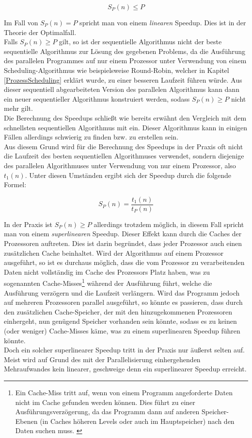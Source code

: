 				\[ S_P(n) \leq P \]
				
				Im Fall von \(S_P(n) = P\) spricht man von einem \textit{linearen} Speedup. Dies ist in der Theorie der Optimalfall.\\
				
				Falls \(S_P(n) \geq P\) gilt, so ist der sequentielle Algorithmus nicht der beste sequentielle Algorithmus zur Lösung des gegebenen Problems, da die Ausführung des parallelen Programmes auf nur einem Prozessor unter Verwendung von einem Scheduling-Algorithmus wie beispielsweise Round-Robin, welcher in Kapitel \ref{ProzessScheduling} erklärt wurde, zu einer besseren Laufzeit führen würde. Aus dieser sequentiell abgearbeiteten Version des parallelen Algorithmus kann dann ein neuer sequentieller Algorithmus konstruiert werden, sodass \(S_P(n) \geq P\) nicht mehr gilt.\\
				Die Berechnung des Speedups schließt wie bereits erwähnt den Vergleich mit dem schnellsten sequentiellen Algorithmus mit ein. Dieser Algorithmus kann in einigen Fällen allerdings schwierig zu finden bzw. zu erstellen sein.\\
				Aus diesem Grund wird für die Berechnung des Speedups in der Praxis oft nicht die Laufzeit des besten sequentiellen Algorithmuses verwendet, sondern diejenige des parallelen Algorithmuses unter Verwendung von nur einem Prozessor, also $t_1(n)$.
				Unter diesen Umständen ergibt sich der Speedup durch die folgende Formel:
				
				\[ S_P(n) = \frac{t_1(n)}{t_P(n)} \]
				
				In der Praxis ist \(S_P(n) \geq P\) allerdings trotzdem möglich, in diesem Fall spricht man von einem \textit{superlinearen} Speedup. Dieser Effekt kann durch die Caches der Prozessoren auftreten. Dies ist darin begründet, dass jeder Prozessor auch einen zusätzlichen Cache beinhaltet. Wird der Algorithmus auf einem Prozessor ausgeführt, so ist es durchaus möglich, dass die vom Prozessor zu verarbeitenden Daten nicht vollständig im Cache des Prozessors Platz haben, was zu sogenannten Cache-Misses\footnote{Ein Cache-Miss tritt auf, wenn von einem Programm angeforderte Daten nicht im Cache gefunden werden können. Dies führt zu einer Ausführungsverzögerung, da das Programm dann auf anderen Speicher-Ebenen (in Caches höheren Levels oder auch im Hauptspeicher) nach den Daten suchen muss. \cite{CacheMissTechopedia}} während der Ausführung führt, welche die Ausführung verzögern und die Laufzeit verlängern. Wird das Programm jedoch auf mehreren Prozessoren parallel ausgeführt, so könnte es passieren, dass durch den zusätzlichen Cache-Speicher, der mit den hinzugekommenen Prozessoren einhergeht, nun genügend Speicher vorhanden sein könnte, sodass es zu keinen (oder weniger) Cache-Misses käme, was zu einem superlinearen Speedup führen könnte.\\
				Doch ein solcher superlinearer Speedup tritt in der Praxis nur äußerst selten auf. Meist wird auf Grund des mit der Parallelisierung einhergehenden Mehraufwandes kein linearer, geschweige denn ein superlinearer Speedup erreicht. \cite{ParaProgRauber}

